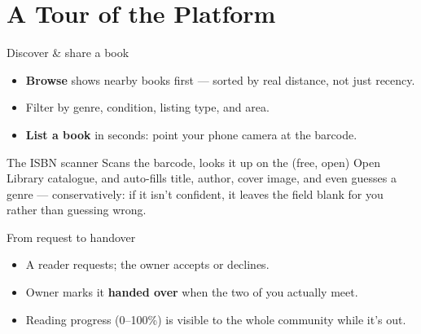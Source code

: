 \documentclass[aspectratio=169,11pt]{beamer}
\begin{document}
\section{A Tour of the Platform}

\begin{frame}{Discover \& share a book}
  \begin{itemize}
    \item \textbf{Browse} shows nearby books first --- sorted by real distance, not just recency.
    \item Filter by genre, condition, listing type, and area.
    \item \textbf{List a book} in seconds: point your phone camera at the barcode.
  \end{itemize}
  \vfill
  \begin{exampleblock}{The ISBN scanner}
    Scans the barcode, looks it up on the (free, open) Open Library catalogue, and auto-fills title, author, cover image, and even guesses a genre --- conservatively: if it isn't confident, it leaves the field blank for you rather than guessing wrong.
  \end{exampleblock}
\end{frame}

\begin{frame}{From request to handover}
  \begin{center}
  \end{center}
  \begin{itemize}
    \item A reader requests; the owner accepts or declines.
    \item Owner marks it \textbf{handed over} when the two of you actually meet.
    \item Reading progress (0--100\%) is visible to the whole community while it's out.
  \end{itemize}
\end{frame}
\end{document}
